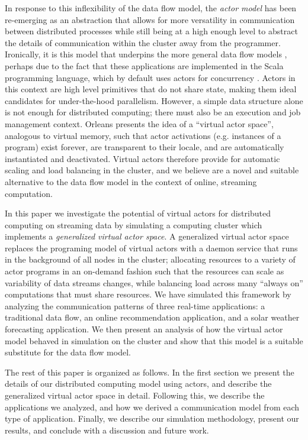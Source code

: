 \documentclass[conference,twocolumn,10pt]{IEEEtran}
\begin{document}
In response to this inflexibility of the data flow model, the \textit{actor model} \cite{hewitt_viewing_1977, agha_actors:_1985} has been re-emerging as an abstraction that allows for more versatility in communication between distributed processes while still being at a high enough level to abstract the details of communication within the cluster away from the programmer. Ironically, it is this model that underpins the more general data flow models \cite{gonzalez_asynchronous_2015}, perhaps due to the fact that these applications are implemented in the Scala programming language, which by default uses actors for concurrency \cite{haller_scala_2009,karmani_actor_2009}. Actors in this context are high level primitives that do not share state, making them ideal candidates for under-the-hood parallelism. However, a simple data structure alone is not enough for distributed computing; there must also be an execution and job management context. Orleans \cite{bernstein_orleans:_2014} presents the idea of a ``virtual actor space'', analogous to virtual memory, such that actor activations (e.g. instances of a program) exist forever, are transparent to their locale, and are automatically instantiated and deactivated. Virtual actors therefore provide for automatic scaling and load balancing in the cluster, and we believe are a novel and suitable alternative to the data flow model in the context of online, streaming computation.

In this paper we investigate the potential of virtual actors for distributed computing on streaming data by simulating a computing cluster which implements a \textit{generalized virtual actor space}. A generalized virtual actor space replaces the programing model of virtual actors with a daemon service that runs in the background of all nodes in the cluster; allocating resources to a variety of actor programs in an on-demand fashion such that the resources can scale as variability of data streams changes, while balancing load across many ``always on'' computations that must share resources. We have simulated this framework by analyzing the communication patterns of three real-time applications: a traditional data flow, an online recommendation application, and a solar weather forecasting application. We then present an analysis of how the virtual actor model behaved in simulation on the cluster and show that this model is a suitable substitute for the data flow model.

The rest of this paper is organized as follows. In the first section we present the details of our distributed computing model using actors, and describe the generalized virtual actor space in detail. Following this, we describe the applications we analyzed, and how we derived a communication model from each type of application. Finally, we describe our simulation methodology, present our results, and conclude with a discussion and future work.
\end{document}
